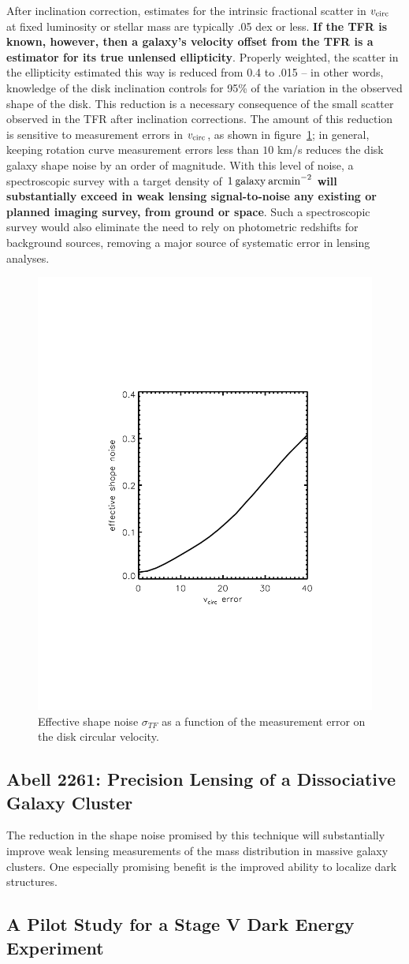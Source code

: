\documentclass[12pt]{article}
\begin{document}
After inclination correction, estimates for the intrinsic fractional scatter in $v_{\rm circ}$ at fixed luminosity or stellar mass are typically .05 dex or less. {\bf If the TFR is known, however, then a galaxy's velocity offset from the TFR is a estimator for its true unlensed ellipticity}. Properly weighted, the scatter in the ellipticity estimated this way is reduced from 0.4 to .015 -- in other words, knowledge of the disk inclination controls for 95\% of the variation in the observed shape of the disk. This reduction is a necessary consequence of the small scatter observed in the TFR after inclination corrections. The amount of this reduction is sensitive to measurement errors in $v_{\rm circ}$, as shown in figure~\ref{fig:shapeNoise}; in general, keeping rotation curve measurement errors less than $10 $ km/s reduces the disk galaxy shape noise by an order of magnitude. With this level of noise, a spectroscopic survey with a target density of $1\: {\rm galaxy \: arcmin}^{-2}$ {\bf will substantially exceed in weak lensing signal-to-noise any existing or planned imaging survey, from ground or space}. Such a spectroscopic survey would also eliminate the need to rely on photometric redshifts for background sources, removing a major source of systematic error in lensing analyses. 

\begin{figure}[t]
\includegraphics[width=0.45\linewidth, bb= 150 150 550 650,clip]{Plots/vcirc_error.pdf}
\caption{Effective shape noise $\sigma_{TF}$ as a  function of the
  measurement error on the disk circular velocity.}
\label{fig:shapeNoise}
\end{figure}

\subsection{Abell 2261: Precision Lensing of a Dissociative Galaxy Cluster}
The reduction in the shape noise promised by this technique will substantially improve weak lensing measurements of the mass distribution in massive galaxy clusters. One especially promising benefit is the improved ability to localize dark structures. 

\subsection{A Pilot Study for a Stage V Dark Energy Experiment}
\end{document}
